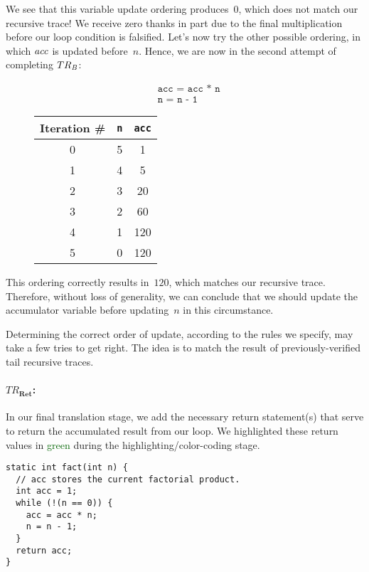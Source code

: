 We see that this variable update ordering produces~$0$, which does not match our recursive trace! 
We receive zero thanks in part due to the final multiplication before our loop condition is falsified. 
Let's now try the other possible ordering, in which $\emph{acc}$ is updated before~$n$. 
Hence, we are now in the second attempt of completing $TR_\emph{B}$:

\begin{figure}[H]
\centering
\begin{minipage}{.4\textwidth}
  \begin{align*}
  &\texttt{acc = acc * n}\\
  &\texttt{n = n - 1}
  \end{align*}
\end{minipage}%
\begin{minipage}{.4\textwidth}
\begin{tabular}{c|c|c}
Iteration \# & \texttt{n} & \texttt{acc}\\
\hline
\hline
0 & 5 & 1\\
\hline
1 & 4 & 5\\
\hline
2 & 3 & 20\\
\hline
3 & 2 & 60\\
\hline
4 & 1 & 120\\
\hline
5 & 0 & 120\\
\end{tabular}
\end{minipage}
\end{figure}

This ordering correctly results in~$120$, which matches our recursive trace. 
Therefore, without loss of generality, we can conclude that we should update the accumulator variable before updating~$n$ in this circumstance.

Determining the correct order of update, according to the rules we specify, may take a few tries to get right. The idea is to match the result of previously-verified tail recursive traces.

\paragraph{\emph{$TR_\mathbf{Ret}$}:}
In our final translation stage, we add the necessary return statement(s) that serve to return the accumulated result from our loop. 
We highlighted these return values in \textcolor{darkgreen}{green} during the highlighting/color-coding stage.

\begin{lstlisting}[language=MyJava]
static int fact(int n) {
  // acc stores the current factorial product. 
  int acc = 1;
  while (!(n == 0)) { 
    acc = acc * n;
    n = n - 1;
  }
  return acc;
}
\end{lstlisting}

